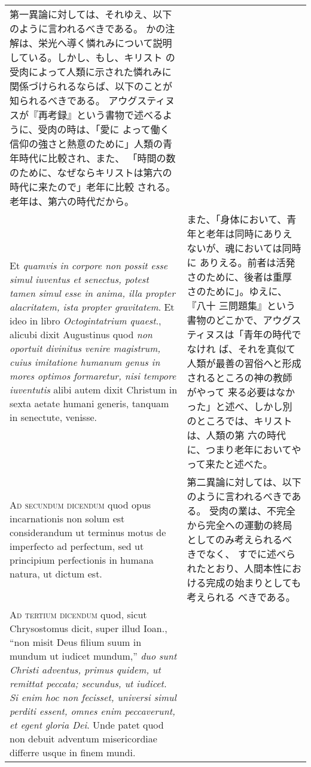 \documentclass[10pt]{jsarticle} %
\begin{document}
\begin{longtable}{p{21em}p{21em}}
第一異論に対しては、それゆえ、以下のように言われるべきである。
かの注解は、栄光へ導く憐れみについて説明している。しかし、もし、キリスト
 の受肉によって人類に示された憐れみに関係づけられるならば、以下のことが
 知られるべきである。
アウグスティヌスが『再考録』という書物で述べるように、受肉の時は、「愛に
 よって働く信仰の強さと熱意のために」人類の青年時代に比較され、また、
 「時間の数のために、なぜならキリストは第六の時代に来たので」老年に比較
 される。老年は、第六の時代だから。


\\

Et {\itshape quamvis in corpore non possit esse simul
iuventus et senectus, potest tamen simul esse in anima, illa propter
alacritatem, ista propter gravitatem}. Et ideo in libro {\itshape Octogintatrium
quaest}., alicubi dixit Augustinus quod {\itshape non oportuit divinitus venire
magistrum, cuius imitatione humanum genus in mores optimos formaretur,
nisi tempore iuventutis} alibi autem dixit Christum in sexta aetate
humani generis, tanquam in senectute, venisse.


&

また、「身体において、青年と老年は同時にありえないが、魂においては同時に
 ありえる。前者は活発さのために、後者は重厚さのために」。ゆえに、『八十
 三問題集』という書物のどこかで、アウグスティヌスは「青年の時代でなけれ
 ば、それを真似て人類が最善の習俗へと形成されるところの神の教師がやって
 来る必要はなかった」と述べ、しかし別のところでは、キリストは、人類の第
 六の時代に、つまり老年においてやって来たと述べた。


\\


{\scshape Ad secundum dicendum} quod opus incarnationis
non solum est considerandum ut terminus motus de imperfecto ad
perfectum, sed ut principium perfectionis in humana natura, ut dictum
est.


&

第二異論に対しては、以下のように言われるべきである。
受肉の業は、不完全から完全への運動の終局としてのみ考えられるべきでなく、
 すでに述べられたとおり、人間本性における完成の始まりとしても考えられる
 べきである。


\\


{\scshape Ad tertium dicendum} quod, sicut Chrysostomus
dicit, super illud Ioan., ``non misit Deus filium suum in mundum ut
iudicet mundum,'' {\itshape duo sunt Christi adventus, primus quidem, ut remittat
peccata; secundus, ut iudicet. Si enim hoc non fecisset, universi simul
perditi essent, omnes enim peccaverunt, et egent gloria Dei}. Unde patet
quod non debuit adventum misericordiae differre usque in finem mundi.



\end{longtable}
\end{document}
